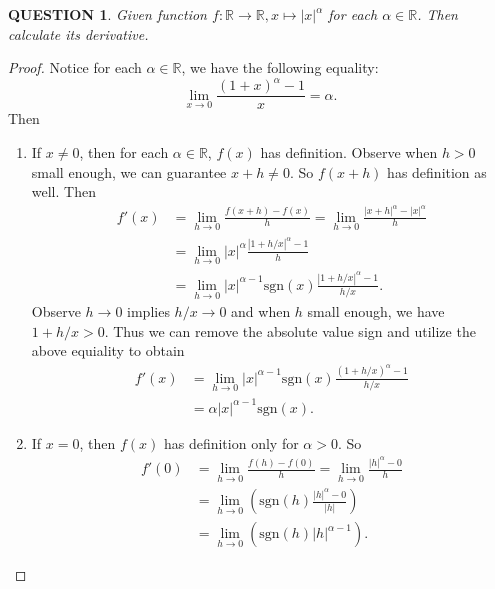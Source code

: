 \documentclass[12pt]{article}
\renewcommand{\(}{\left(}%
\renewcommand{\)}{\right)}%
\renewcommand{\[}{\left[}%
\renewcommand{\]}{\right]}%
\renewcommand{\r}{\mathbb{R}}
\newtheorem{question}{QUESTION}[section]}
\newtheorem{proof}{Proof.}}
\begin{document}
  \begin{question}
   Given function $f:\r\to \r,x\mapsto |x|^\alpha$ for each $\alpha\in\r$. Then calculate its derivative.
  \end{question}
  \begin{proof}
   Notice for each $\alpha\in\r$, we have the following equality:
   \begin{equation*}
    \lim_{x\to0}\frac{(1+x)^\alpha-1 }{x}=\alpha.
   \end{equation*}
   Then
   \begin{enumerate}
    \item If $x\neq 0$, then for each $\alpha\in\r$, $f(x)$ has definition. Observe when $h>0$ small enough, we can guarantee $x+h\neq 0$. So $f(x+h)$ has definition as well. Then
    \begin{equation*}
     \begin{split}
      f'(x)&=\lim_{h\to0}\frac{f(x+h)-f(x)}{h}=\lim_{h\to0}\frac{|x+h|^\alpha -|x|^\alpha}{h}\\
      &=\lim_{h\to0}|x|^\alpha \frac{|1+h/x|^\alpha -1}{h}\\
      &=\lim_{h\to0}|x|^{\alpha-1}\mathrm{sgn}(x) \frac{|1+h/x|^\alpha -1}{h/x}.
     \end{split}
    \end{equation*}
    Observe $h\to0$ implies $h/x\to 0$ and when $h$ small enough, we have $1+h/x>0$. Thus we can remove the absolute value sign and utilize the above equiality to obtain
    \begin{equation*}
     \begin{split}
      f'(x)&=\lim_{h\to0}|x|^{\alpha-1}\mathrm{sgn}(x) \frac{(1+h/x)^\alpha -1}{h/x}\\
      &=\alpha |x|^{\alpha-1}\mathrm{sgn}(x).
     \end{split}
    \end{equation*}
    \item If $x=0$, then $f(x)$ has definition only for $\alpha>0$. So
    \begin{equation*}
     \begin{split}
      f'(0)&=\lim_{h\to0}\frac{f(h)-f(0)}{h}=\lim_{h\to0}\frac{|h|^\alpha-0}{h}\\
      &= \lim_{h\to0}\(\mathrm{sgn}(h)\frac{|h|^\alpha-0}{|h|}\)\\
      &=\lim_{h\to0}\(\mathrm{sgn}(h)|h|^{\alpha-1}\).
     \end{split}
    \end{equation*}
    \begin{enumerate}

\end{enumerate}
\end{enumerate}
\end{proof}
\end{document}
